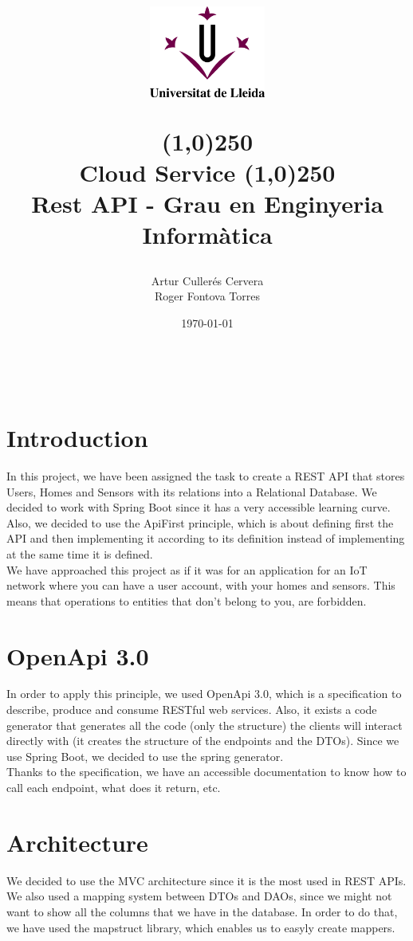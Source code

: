 \documentclass[12pt, letterpaper]{article}
\title{%
    \begin{center}
	\includegraphics[width=4cm,height=3cm]{udl.png}
    \end{center}
    \line(1,0){250}\\[0.3cm]
    \textbf{Cloud Service}
    \line(1,0){250}
    \\[0.5cm]
	\large Rest API - Grau en Enginyeria Informàtica
}
\author{Artur Cullerés Cervera \\ Roger Fontova Torres}
\date{\today}
\begin{document}
    
\maketitle
\thispagestyle{empty}
\newpage
\tableofcontents
\listoffigures
\newpage
\
\newpage


\section{Introduction}
\label{sections:introduction}
In this project, we have been assigned the task to create a REST API that stores Users, Homes and Sensors with its relations into a Relational Database. We decided to work with Spring Boot since it has a very accessible learning curve. Also, we decided to use the ApiFirst principle, which is about defining first the API and then implementing it according to its definition instead of implementing at the same time it is defined. \\

We have approached this project as if it was for an application for an IoT network where you can have a user account, with your homes and sensors. This means that operations to entities that don't belong to you, are forbidden.



\section{OpenApi 3.0}
In order to apply this principle, we used OpenApi 3.0, which is a specification to describe, produce and consume RESTful web services. Also, it exists a code generator that generates all the code (only the structure) the clients will interact directly with (it creates the structure of the endpoints and the DTOs). Since we use Spring Boot, we decided to use the spring generator. \\

Thanks to the specification, we have an accessible documentation to know how to call each endpoint, what does it return, etc.

\section{Architecture}
We decided to use the MVC architecture since it is the most used in REST APIs. We also used a mapping system between DTOs and DAOs, since we might not want to show all the columns that we have in the database. In order to do that, we have used the mapstruct library, which enables us to easyly create mappers.
\end{document}
